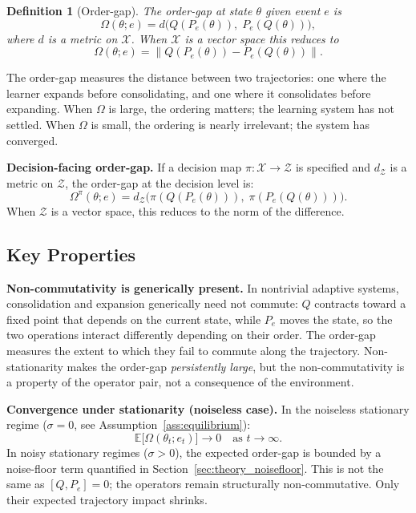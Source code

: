 \documentclass[12pt,a4paper]{article}
\newtheorem{definition}{Definition}[section]
\newcommand{\X}{\mathcal{X}}
\newcommand{\Z}{\mathcal{Z}}
\newcommand{\norm}[1]{\left\lVert#1\right\rVert}
\newcommand{\Ogap}{\Omega}
\newcommand{\Dgap}{\Omega^\pi}
\begin{document}
\begin{definition}[Order-gap]
\label{def:ordergap}
The \emph{order-gap} at state $\theta$ given event $e$ is
\begin{equation}
\label{eq:ordergap}
\Ogap(\theta; e) = d\bigl(Q(P_e(\theta)),\; P_e(Q(\theta))\bigr),
\end{equation}
where $d$ is a metric on $\X$. When $\X$ is a vector space this reduces to
\[
\Ogap(\theta; e) = \norm{Q(P_e(\theta)) - P_e(Q(\theta))}.
\]
\end{definition}

The order-gap measures the distance between two trajectories: one where the
learner expands before consolidating, and one where it consolidates before
expanding. When $\Ogap$ is large, the ordering matters; the learning system
has not settled. When $\Ogap$ is small, the ordering is nearly
irrelevant; the system has converged.

\textbf{Decision-facing order-gap.}
If a decision map $\pi : \X \to \Z$ is specified and $d_\Z$ is a metric on $\Z$,
the order-gap at the decision level is:
\begin{equation}
\label{eq:ordergap_decision}
\Dgap(\theta; e)
= d_\Z\!\bigl(\pi(Q(P_e(\theta))),\; \pi(P_e(Q(\theta)))\bigr).
\end{equation}
When $\Z$ is a vector space, this reduces to the norm of the difference.

\subsection{Key Properties}
\label{sec:properties}

\textbf{Non-commutativity is generically present.}
In nontrivial adaptive systems, consolidation and expansion generically need
not commute: $Q$ contracts toward a fixed point that depends on the current
state, while $P_e$ moves the state, so the two operations interact
differently depending on their order. The order-gap measures the extent to
which they fail to commute along the trajectory. Non-stationarity makes the
order-gap \emph{persistently large}, but the non-commutativity is a property
of the operator pair, not a consequence of the environment.

\textbf{Convergence under stationarity (noiseless case).}
In the noiseless stationary regime ($\sigma = 0$, see Assumption~\ref{ass:equilibrium}):
\begin{equation}
\label{eq:convergence}
\mathbb{E}\bigl[\Ogap(\theta_t; e_t)\bigr] \to 0 \quad \text{as } t \to \infty.
\end{equation}
In noisy stationary regimes ($\sigma > 0$), the expected order-gap is bounded
by a noise-floor term quantified in Section~\ref{sec:theory_noisefloor}.
This is not the same as $[Q, P_e] = 0$; the operators remain structurally
non-commutative. Only their expected trajectory impact shrinks.
\end{document}
